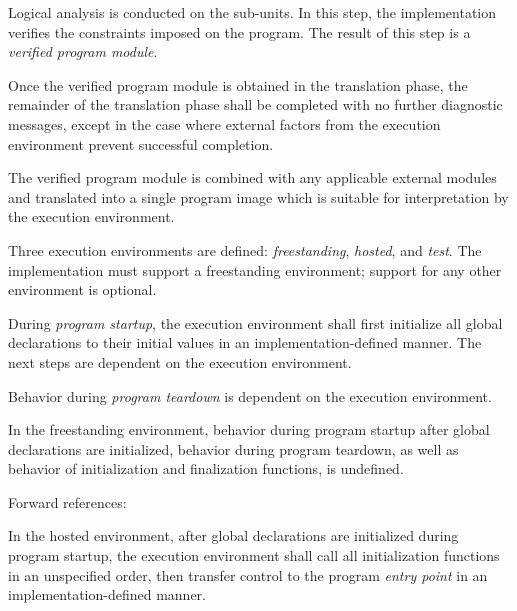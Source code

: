\specsubitem
Logical analysis is conducted on the sub-units. In this step, the implementation
verifies the constraints imposed on the program. The result of this step is a
\textit{verified program module}.


\specsubitem
Once the verified program module is obtained in the translation phase, the
remainder of the translation phase shall be completed with no further
diagnostic messages, except in the case where external factors from the
execution environment prevent successful completion.


\specsubitem
The verified program module is combined with any applicable external modules and
translated into a single program image which is suitable for interpretation by
the execution environment.


\specsubitem
Three execution environments are defined: \textit{freestanding},
\textit{hosted}, and \textit{test}. The implementation must support a
freestanding environment; support for any other environment is optional.

\specsubitem
During \textit{program startup}, the execution environment shall first
initialize all global declarations to their initial values in an
implementation-defined manner. The next steps are dependent on the execution
environment.

\specsubitem
Behavior during \textit{program teardown} is dependent on the execution
environment.


\specsubsubitem
In the freestanding environment, behavior during program startup after global
declarations are initialized, behavior during program teardown, as well as
behavior of initialization and finalization functions, is undefined.

Forward references: 


\specsubsubitem
In the hosted environment, after global declarations are initialized during
program startup, the execution environment shall call all initialization
functions in an unspecified order, then transfer control to the program
\textit{entry point} in an implementation-defined manner.

